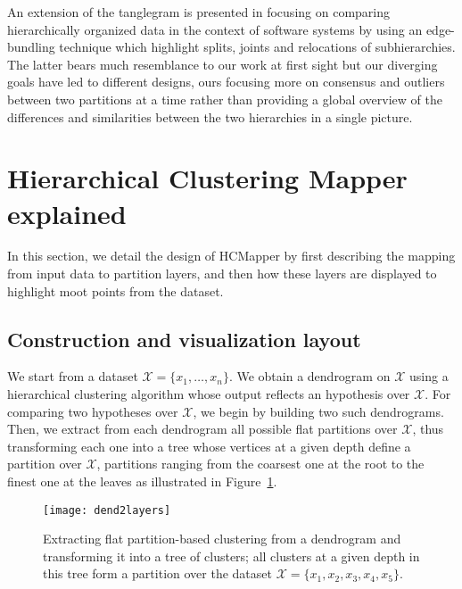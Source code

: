 \documentclass[10pt,conference,a4paper]{IEEEtran}
\begin{document}
An extension of the tanglegram is presented in \cite{VizHOD} focusing on comparing hierarchically organized data in the context of software systems by using an edge-bundling technique which highlight splits, joints and relocations of subhierarchies. The latter bears much resemblance to our work at first sight but our diverging goals have led to different designs, ours focusing more on consensus and outliers between two partitions at a time rather than providing a global overview of the differences and similarities between the two hierarchies in a single picture.





\section{Hierarchical Clustering Mapper explained}

In this section, we detail the design of HCMapper by first describing the mapping from input data to partition layers, and then how these layers are displayed to highlight moot points from the dataset.










\subsection{Construction and visualization layout}

We start from a dataset $\mathcal{X} = \{x_1,\ldots,x_n\}$. We obtain a dendrogram on $\mathcal{X}$ using a hierarchical clustering algorithm whose output reflects an hypothesis over $\mathcal{X}$. For comparing two hypotheses over $\mathcal{X}$, we begin by building two such dendrograms. Then, we extract from each dendrogram all possible flat partitions over $\mathcal{X}$, thus transforming each one into a tree whose vertices at a given depth define a partition over $\mathcal{X}$, partitions ranging from the coarsest one at the root to the finest one at the leaves as illustrated in Figure~\ref{dend2layers}.

\begin{figure}[htb]
  \centering
\texttt{[image: dend2layers]}
  \caption{Extracting flat partition-based clustering from a dendrogram and transforming it into a tree of clusters; all clusters at a given depth in this tree form a partition over the dataset $\mathcal{X} = \{x_1,x_2,x_3,x_4,x_5\}$.}
  \label{dend2layers}
\end{figure}
  
\end{document}
